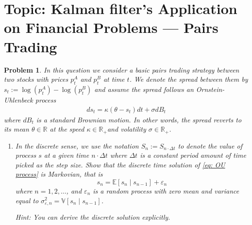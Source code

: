 \documentclass[11pt]{article}
\theoremstyle{plain} %
\newtheorem{problem}[theorem]{Problem}
\theoremstyle{remark}
\begin{document}
\section{Topic: Kalman filter's Application on Financial Problems --- Pairs Trading}
\begin{problem}
In this question we consider a basic pairs trading strategy between two stocks
with prices $p_t^A$ and $p_t^B$ at time $t$. We denote the spread between them
by $s_t:=\log \left(p_t^A\right)-\log \left(p_t^B\right)$ and assume the spread
follows an Ornstein-Uhlenbeck process
\begin{align}
  d s_t=\kappa\left(\theta-s_t\right) d t+\sigma d B_t \label{eq: OU process}
\end{align}
where $d B_t$ is a standard Brownian motion. In other words, the spread reverts
to its mean $\theta \in \mathbb{R}$ at the speed $\kappa \in \mathbb{R}_{+}$and
volatility $\sigma \in \mathbb{R}_{+}$.
\begin{enumerate}[label=(\alph*)]
  \item In the discrete sense, we use the notation $S_n := S_{n\cdot \Delta t}$
        to denote the value of process $s$ at a given time $n\cdot \Delta t$ where
        $\Delta t$ is a constant period amount of time picked as the step size.
        Show that the discrete time solution of \cref{eq: OU process} is
        Markovian, that is
        $$
          s_n=\mathbb{E}\left[s_n \mid s_{n-1}\right]+\varepsilon_n
        $$
        where $n=1,2, \ldots$, and $\varepsilon_n$ is a random process with zero
        mean and variance equal to $\sigma_{\varepsilon,
            n}^2=\mathbb{V}\left[s_n \mid s_{n-1}\right]$.

        Hint: You can derive the discrete solution explicitly.


\end{enumerate}
\end{problem}
\end{document}
